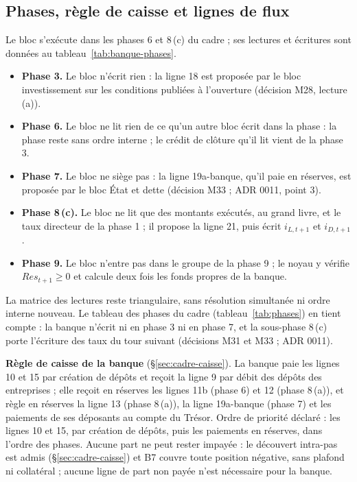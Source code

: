 \documentclass[11pt,a4paper]{article}
\begin{document}
\subsection{Phases, règle de caisse et lignes de flux}
\label{sec:banque-phases}
\begin{proposee}
Le bloc s'exécute dans les phases 6 et 8\,(c) du cadre ; ses lectures et écritures sont données au tableau~\ref{tab:banque-phases}.
\begin{itemize}
\item \textbf{Phase 3.} Le bloc n'écrit rien : la ligne 18 est proposée par le bloc investissement sur les conditions publiées à l'ouverture (décision M28, lecture (a)).
\item \textbf{Phase 6.} Le bloc ne lit rien de ce qu'un autre bloc écrit dans la phase : la phase reste sans ordre interne ; le crédit de clôture qu'il lit vient de la phase 3.
\item \textbf{Phase 7.} Le bloc ne siège pas : la ligne 19a-banque, qu'il paie en réserves, est proposée par le bloc État et dette (décision M33 ; ADR 0011, point 3).
\item \textbf{Phase 8\,(c).} Le bloc ne lit que des montants exécutés, au grand livre, et le taux directeur de la phase 1 ; il propose la ligne 21, puis écrit $i_{L,t+1}$ et $i_{D,t+1}$.
\item \textbf{Phase 9.} Le bloc n'entre pas dans le groupe de la phase 9 ; le noyau y vérifie $\mathit{Res}_{t+1} \ge 0$ et calcule deux fois les fonds propres de la banque.
\end{itemize}
La matrice des lectures reste triangulaire, sans résolution simultanée ni ordre interne nouveau. Le tableau des phases du cadre (tableau~\ref{tab:phases}) en tient compte : la banque n'écrit ni en phase 3 ni en phase 7, et la sous-phase 8\,(c) porte l'écriture des taux du tour suivant (décisions M31 et M33 ; ADR 0011).

\textbf{Règle de caisse de la banque} (\S\ref{sec:cadre-caisse}). La banque paie les lignes 10 et 15 par création de dépôts et reçoit la ligne 9 par débit des dépôts des entreprises ; elle reçoit en réserves les lignes 11b (phase 6) et 12 (phase 8\,(a)), et règle en réserves la ligne 13 (phase 8\,(a)), la ligne 19a-banque (phase 7) et les paiements de ses déposants au compte du Trésor. Ordre de priorité déclaré : les lignes 10 et 15, par création de dépôts, puis les paiements en réserves, dans l'ordre des phases. Aucune part ne peut rester impayée : le découvert intra-pas est admis (\S\ref{sec:cadre-caisse}) et B7 couvre toute position négative, sans plafond ni collatéral ; aucune ligne de part non payée n'est nécessaire pour la banque.


\end{proposee}
\end{document}
